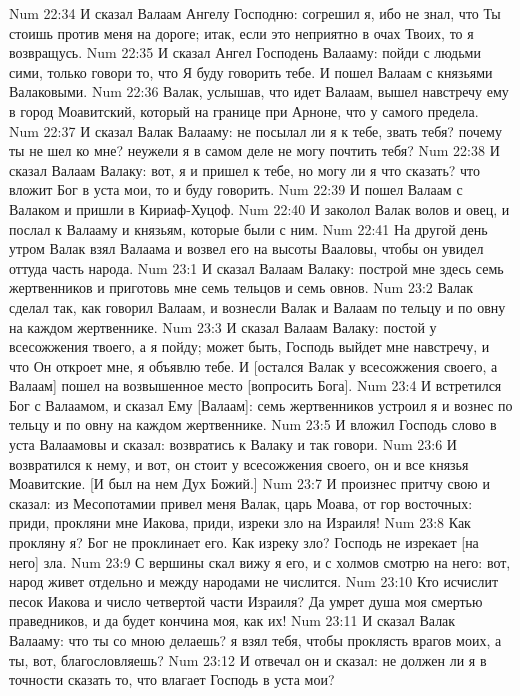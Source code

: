 \vs Num 22:34 И сказал Валаам Ангелу Господню: согрешил я, ибо не знал, что Ты стоишь против меня на дороге; итак, если это неприятно в очах Твоих, то я возвращусь.
\vs Num 22:35 И сказал Ангел Господень Валааму: пойди с людьми сими, только говори то, что Я буду говорить тебе. И пошел Валаам с князьями Валаковыми.
\rsbpar\vs Num 22:36 Валак, услышав, что идет Валаам, вышел навстречу ему в город Моавитский, который на границе при Арноне, что у самого предела.
\vs Num 22:37 И сказал Валак Валааму: не посылал ли я к тебе, звать тебя? почему ты не шел ко мне? неужели я в самом деле не могу почтить тебя?
\vs Num 22:38 И сказал Валаам Валаку: вот, я и пришел к тебе, но могу ли я что  сказать? что вложит Бог в уста мои, то и буду говорить.
\vs Num 22:39 И пошел Валаам с Валаком и пришли в Кириаф-Хуцоф.
\vs Num 22:40 И заколол Валак волов и овец, и послал к Валааму и князьям, которые были с ним.
\vs Num 22:41 На другой день утром Валак взял Валаама и возвел его на высоты Вааловы, чтобы он увидел оттуда часть народа.
\vs Num 23:1 И сказал Валаам Валаку: построй мне здесь семь жертвенников и приготовь мне семь тельцов и семь овнов.
\vs Num 23:2 Валак сделал так, как говорил Валаам, и вознесли Валак и Валаам по тельцу и по овну на каждом жертвеннике.
\vs Num 23:3 И сказал Валаам Валаку: постой у всесожжения твоего, а я пойду; может быть, Господь выйдет мне навстречу, и что Он откроет мне, я объявлю тебе. И [остался Валак у всесожжения своего, а Валаам] пошел на возвышенное место [вопросить Бога].
\vs Num 23:4 И встретился Бог с Валаамом, и сказал Ему [Валаам]: семь жертвенников устроил я и вознес по тельцу и по овну на каждом жертвеннике.
\vs Num 23:5 И вложил Господь слово в уста Валаамовы и сказал: возвратись к Валаку и так говори.
\vs Num 23:6 И возвратился к нему, и вот, он стоит у всесожжения своего, он и все князья Моавитские. [И был на нем Дух Божий.]
\vs Num 23:7 И произнес притчу свою и сказал: из Месопотамии привел меня Валак, царь Моава, от гор восточных: приди, прокляни мне Иакова, приди, изреки зло на Израиля!
\vs Num 23:8 Как прокляну я? Бог не проклинает его. Как изреку зло? Господь не изрекает [на него] зла.
\vs Num 23:9 С вершины скал вижу я его, и с холмов смотрю на него: вот, народ живет отдельно и между народами не числится.
\vs Num 23:10 Кто исчислит песок Иакова и число четвертой части Израиля? Да умрет душа моя смертью праведников, и да будет кончина моя, как их!
\vs Num 23:11 И сказал Валак Валааму: что ты со мною делаешь? я взял тебя, чтобы проклясть врагов моих, а ты, вот, благословляешь?
\vs Num 23:12 И отвечал он и сказал: не должен ли я в точности сказать то, что влагает Господь в уста мои?
